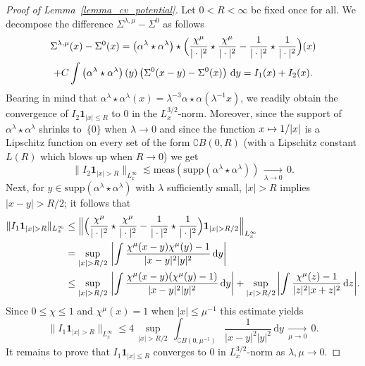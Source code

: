 \documentclass[JEP,XML,SOM,NoEqCountersInSection,NoFloatCountersInSection,Unicode,published]{cedram}
\newcommand\mto{\mathchoice{\longmapsto}{\mapsto}{\mapsto}{\mapsto}}
\theoremstyle{definition}
\newenvironment{ProofOf}[1]{\begin{proof}[Proof of #1]}{\end{proof}}
\newcommand{\ud}{\, {\mathrm{d}}}
\begin{document}
\begin{ProofOf}{Lemma~\ref{lemma_cv_potential}}
Let $0<R<\infty$ be fixed once for all. We decompose the difference $\Sigma^{\lambda,\mu}-\Sigma^{0}$ as follows
\begin{multline*}
\Sigma^{\lambda,\mu}(x)-\Sigma^{0}(x)=\left(\alpha^{\lambda}\star\alpha^{\lambda}\right)\star\Bigl(\frac{\chi^{\mu}}{|\cdot|^{2}}\star\frac{\chi^{\mu}}{|\cdot|^{2}}-\frac{1}{|\cdot|^{2}}\star\frac{1}{|\cdot|^{2}}\Bigr)(x)\\
+C\int\left(\alpha^{\lambda}\star\alpha^{\lambda}\right)(y)\left(\Sigma^{0}(x-y)-\Sigma^{0}(x)\right)\ud y=I_{1}(x)+I_{2}(x).
\end{multline*}
Bearing in mind that $\alpha^{\lambda}\star\alpha^{\lambda}(x)=\lambda^{-3}\alpha\star\alpha(\lambda^{-1}x)$,
we readily obtain
the convergence of $I_{2}\mathbf{1}_{|x|\leq R}$ to 0 in the $L_{x}^{3/2}$-norm. Moreover, since the support of $\alpha^{\lambda}\star\alpha^{\lambda}$ shrinks to~$\{0\}$ when $\lambda\to 0$ and since the function $x\mto 1/|x|$ is a Lipschitz function on every set of the form $\complement B(0,R)$ (with a Lipschitz constant $L(R)$ which blows up when $R\to 0$) we get
\[
\|I_{2}\mathbf{1}_{|x|>R}\|_{L_{x}^{\infty}}\lesssim\mathrm{meas}\left(\mathrm{supp}\left(\alpha^{\lambda}\star\alpha^{\lambda}\right)\right)\,\underset{\lambda\to 0}{\to}\,0.
\]
Next, for $y\in \mathrm{supp}(\alpha^\lambda\star\alpha^\lambda)$ with $\lambda$ sufficiently small, $|x|>R$ implies $|x-y|>R/2$; it follows that
\begin{align*}
\|I_{1}\mathbf{1}_{|x|>R}\|_{L_{x}^{\infty}}
&\leq\Bigl\|\Bigl(\frac{\chi^{\mu}}{|\cdot|^{2}}\star\frac{\chi^{\mu}}{|\cdot|^{2}}-\frac{1}{|\cdot|^{2}}\star\frac{1}{|\cdot|^{2}}\Bigr)\mathbf{1}_{|x|>R/2}\Bigr\|_{L_{x}^{\infty}}\\
&=\underset{|x|>R/2}{\sup}\,\left|\int\frac{\chi^{\mu}(x-y)\chi^{\mu}(y)-1}{|x-y|^{2}|y|^{2}}\ud y\right|\\
&\leq\underset{|x|>R/2}{\sup}\,\left|\int\frac{\chi^{\mu}(x-y)(\chi^{\mu}(y)-1)}{|x-y|^{2}|y|^{2}}\ud y\right|+\underset{|x|>R/2}{\sup}\,\biggl|\int\frac{\chi^{\mu}(z)-1}{|z|^{2}|x+z|^{2}}\ud z\biggr|.
\end{align*}
Since $0\leq\chi\leq 1$ and $\chi^{\mu}(x)=1$ when $|x|\leq \mu^{-1}$ this estimate yields
\[
\|I_{1}\mathbf{1}_{|x|>R}\|_{L_{x}^{\infty}}\leq 4\,\underset{|x|>R/2}{\sup}\,\int_{\complement B(0,\mu^{-1})}\frac{1}{|x-y|^{2}|y|^{2}}\ud y\,\underset{\mu\to 0}{\to}\,0.
\]
It remains to prove that $I_{1}\mathbf{1}_{|x|\leq R}$ converges to $0$ in $L_{x}^{3/2}$-norm as $\lambda,\mu\to 0$.

\end{ProofOf}
\end{document}

